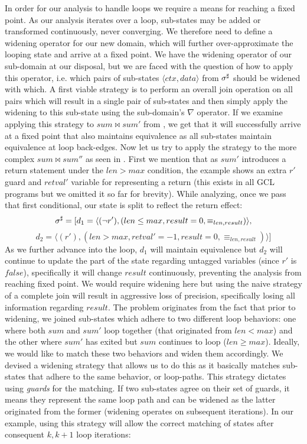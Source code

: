 In order for our analysis to handle loops we require a means for reaching a fixed point. As our analysis iterates over a loop, sub-states may be added or transformed continuously, never converging. We therefore need to define a widening operator for our new domain, which will further over-approximate the looping state and arrive at a fixed point. We have the widening operator of our sub-domain at our disposal, but we are faced with the question of how to apply this operator, i.e. which pairs of sub-states $\langle ctx , data \rangle$ from $\sigma^\sharp$ should be widened with which. A first viable strategy is to perform an overall join operation on all pairs which will result in a single pair of sub-states and then simply apply the widening to this sub-state using the sub-domain's $\nabla$ operator. If we examine applying this strategy to $sum \bowtie sum'$ from , we get that it will successfully arrive at a fixed point that also maintains equivalence as all sub-states maintain equivalence at loop back-edges. Now let us try to apply the strategy to the more complex $sum \bowtie sum''$ as seen in . First we mention that as $sum'$ introduces a return statement under the $len > max$ condition, the example shows an extra $r'$ guard and $retval'$ variable for representing a return (this exists in all GCL programs but we omitted it so far for brevity). While analyzing, once we pass that first conditional, our state is split to reflect the return effect:
{\footnotesize
\[
\sigma^\sharp = [ d_1 = \langle (\neg r'),(len \leq max, result = 0, \equiv_{len,result}) \rangle,
\]
\[
d_2 = \langle (r'),(len > max, retval' = -1, result = 0, \equiv_{len,result}) \rangle ]
\]
}
As we further advance into the loop, $d_1$ will maintain equivalence but $d_2$ will continue to update the part of the state regarding untagged variables  (since $r'$ is $false$), specifically it will change $result$ continuously, preventing the analysis from reaching fixed point. We would require widening here but using the naive strategy of a complete join will result in aggressive loss of precision, specifically losing all information regarding $result$. The problem originates from the fact that prior to widening, we joined sub-states which adhere to two different loop behaviors: one where both $sum$ and $sum'$ loop together (that originated from $len < max$) and the other where $sum'$ has exited but $sum$ continues to loop ($len \geq max$). Ideally, we would like to match these two behaviors and widen them accordingly. We devised a widening strategy that allows us to do this as it basically matches sub-states that adhere to the same behavior, or loop-paths. This strategy dictates using \emph{guards} for the matching. If two sub-states agree on their set of guards, it means they represent the same loop path and can be widened as the latter originated from the former (widening operates on subsequent iterations). In our example, using this strategy will allow the correct matching of states after consequent $k, k+1$ loop iterations:
